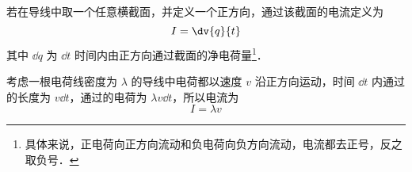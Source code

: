 
\begin{issues}
\issueDraft
\end{issues}


若在导线中取一个任意横截面，并定义一个正方向，通过该截面的电流定义为
\begin{equation}
I = \dv{q}{t}
\end{equation}
其中 $\dd{q}$ 为 $\dd{t}$ 时间内由正方向通过截面的净电荷量\footnote{具体来说，正电荷向正方向流动和负电荷向负方向流动，电流都去正号，反之取负号．}．

考虑一根电荷线密度为 $\lambda$ 的导线中电荷都以速度 $v$ 沿正方向运动，时间 $\dd{t}$ 内通过的长度为 $v\dd{t}$，通过的电荷为 $\lambda v\dd{t}$，所以电流为
\begin{equation}
I = \lambda v
\end{equation}
